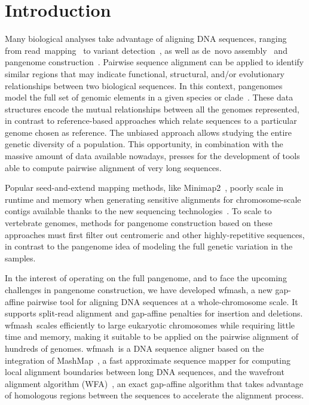 \documentclass{bioinfo}
\newcommand{\wfmash}{wfmash}
\begin{document}
    \maketitle


    \section{Introduction}

    Many biological analyses take advantage of aligning DNA sequences, ranging from read~mapping~\citep{22388286, BWA_MEM, 23103880}
    to variant detection~\citep{21478889}, as well as de~novo assembly~\citep{19251739} and
    pangenome construction~\citep{33177663, 33066802}. Pairwise sequence alignment can be applied to identify
    similar regions that may indicate functional, structural, and/or evolutionary
    relationships between two biological sequences. In this context, pangenomes model the full set
    of genomic elements in a given species or clade~\citep{32453966}. These data structures encode the mutual
    relationships between all the genomes represented, in contrast to reference-based approaches which
    relate sequences to a particular genome chosen as reference. The unbiased approach allows studying
    the entire genetic diversity of a population. This opportunity, in combination with the massive amount of data
    available nowadays, presses for the development of tools able to compute pairwise alignment of very long sequences.

    Popular seed-and-extend mapping methods, like Minimap2~\citep{29750242}, poorly scale in runtime and memory
    when generating sensitive alignments for chromosome-scale contigs available thanks to the new sequencing
    technologies~\citep{33288905}. To scale to vertebrate genomes, methods for pangenome construction based on these
    approaches must first filter out centromeric and other highly-repetitive sequences, in contrast to the pangenome
    idea of modeling the full genetic variation in the samples.

    In the interest of operating on the full pangenome, and to face the upcoming challenges in pangenome construction,
    we have developed \wfmash\/, a new gap-affine pairwise tool for aligning DNA sequences at a whole-chromosome scale.
    It supports split-read alignment and gap-affine penalties for insertion and deletions. \wfmash\ scales
    efficiently to large eukaryotic chromosomes while requiring little time and memory, making it suitable to
    be applied on the pairwise alignment of hundreds of genomes. \wfmash\ is a DNA sequence aligner based on the
    integration of MashMap~\citep{30423094}, a fast approximate sequence mapper for computing local alignment boundaries
    between long DNA sequences, and the wavefront alignment algorithm (WFA)~\citep{32915952}, an exact gap-affine
    algorithm that takes advantage of homologous regions between the sequences to accelerate the alignment process.
\end{document}
